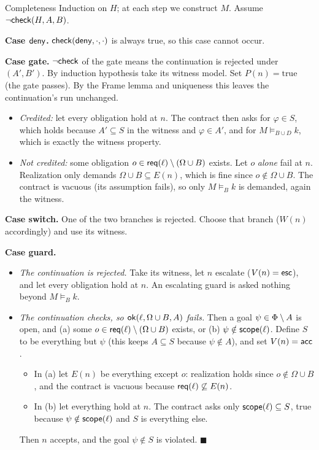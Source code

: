 \begin{plainproof}{Completeness}
Induction on $H$; at each step we construct $M$. Assume $\neg\mathsf{check}(H,A,B)$.

\medskip\textbf{Case $\mathsf{deny}$.} $\mathsf{check}(\mathsf{deny},\cdot,\cdot)$ is always true, so this case cannot occur.

\medskip\textbf{Case gate.} $\neg\mathsf{check}$ of the gate means the continuation is rejected under $(A',B')$. By induction hypothesis take its witness model. Set $P(n)=\text{true}$ (the gate passes). By the Frame lemma and uniqueness this leaves the continuation's run unchanged.
\begin{itemize}
\item \emph{Credited:} let every obligation hold at $n$. The contract then asks for $\varphi\in S$, which holds because $A'\subseteq S$ in the witness and $\varphi\in A'$, and for $M\models_{B\cup D}k$, which is exactly the witness property.
\item \emph{Not credited:} some obligation $o\in\mathsf{req}(\ell)\setminus(\Omega\cup B)$ exists. Let $o$ \emph{alone} fail at $n$. Realization only demands $\Omega\cup B\subseteq E(n)$, which is fine since $o\notin\Omega\cup B$. The contract is vacuous (its assumption fails), so only $M\models_B k$ is demanded, again the witness.
\end{itemize}

\medskip\textbf{Case switch.} One of the two branches is rejected. Choose that branch ($W(n)$ accordingly) and use its witness.

\medskip\textbf{Case guard.}
\begin{itemize}
\item \emph{The continuation is rejected.} Take its witness, let $n$ escalate ($V(n)=\mathsf{esc}$), and let every obligation hold at $n$. An escalating guard is asked nothing beyond $M\models_B k$.
\item \emph{The continuation checks, so $\mathsf{ok}(\ell,\Omega\cup B,A)$ fails.} Then a goal $\psi\in\Phi\setminus A$ is open, and (a) some $o\in\mathsf{req}(\ell)\setminus(\Omega\cup B)$ exists, or (b) $\psi\notin\mathsf{scope}(\ell)$. Define $S$ to be everything but $\psi$ (this keeps $A\subseteq S$ because $\psi\notin A$), and set $V(n)=\mathsf{acc}$.
  \begin{itemize}
  \item In (a) let $E(n)$ be everything except $o$: realization holds since $o\notin\Omega\cup B$, and the contract is vacuous because $\mathsf{req}(\ell)\not\subseteq E(n)$.
  \item In (b) let everything hold at $n$. The contract asks only $\mathsf{scope}(\ell)\subseteq S$, true because $\psi\notin\mathsf{scope}(\ell)$ and $S$ is everything else.
  \end{itemize}
  Then $n$ accepts, and the goal $\psi\notin S$ is violated. \hfill$\blacksquare$
\end{itemize}
\end{plainproof}

